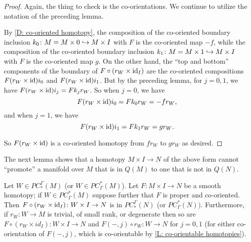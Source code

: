 \begin{proof}
	Again, the thing to check is the co-orientations. We continue to utilize the notation of the preceding lemma.

	By \cref{D: co-oriented homotopy}, the composition of the co-oriented boundary inclusion $k_0 \colon M = M \times 0 \hookrightarrow M \times I$ with $F$ is the co-oriented map $-f$, while the composition of the co-oriented boundary inclusion $k_1 \colon M = M \times 1 \hookrightarrow M \times I$ with $F$ is the co-oriented map
	$g$. On the other hand, the ``top and bottom'' components of the boundary of $F \circ (r_W \times \mathrm{id}_I)$ are the co-oriented compositions $F (r_W\times \mathrm{id}) i_0$ and $F (r_W\times \mathrm{id}) i_1$.
	But by the preceding lemma, for $j=0,1$, we have $F (r_W\times \mathrm{id}) i_j = F k_j r_W$.
	So when $j=0$, we have
	$$ F (r_W\times \mathrm{id}) i_0 = F k_0 r_W = -f r_W,$$
	and when $j=1$, we have
	$$ F (r_W\times \mathrm{id}) i_1 = F k_1 r_W = g r_W.$$

	So $F (r_W\times \mathrm{id})$ is a co-oriented homotopy from $fr_W$ to $gr_W$ as desired.
\end{proof}

The next lemma shows that a homotopy $M \times I \to N$ of the above form cannot ``promote'' a manifold over $M$ that is in $Q(M)$ to one that is not in $Q(N)$.

\begin{lemma}\label{L: dessicated homotopy}
	Let $W \in PC_*^\Gamma(M)$ (or $W \in PC^*_\Gamma(M)$).
	Let $F \colon M \times I \to N$ be a smooth homotopy; if $W \in PC^*_\Gamma(M)$ suppose further that $F$ is proper and co-oriented.
	Then $F \circ (r_W \times \mathrm{id}_I) \colon W \times I \to N$ is in $PC_*^\Gamma(N)$ (or $PC^*_\Gamma(N))$.
	Furthermore,
	if $r_W \colon W \to M$ is trivial, of small rank, or degenerate then so are
	$F \circ (r_W \times id_I) \colon W \times I \to N$ and $F(-,j) \circ r_W \colon W \to N$ for $j=0,1$ (for either co-orientation of $F(-,j)$, which is co-orientable by \cref{L: co-orientable homotopies}).
\end{lemma}

